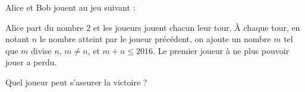 Alice et Bob jouent au jeu suivant :

Alice part du nombre $2$ et les joueurs jouent chacun leur tour. À chaque tour, en notant $n$ le nombre atteint par le joueur précédent, on ajoute un nombre $m$ tel que $m$ divise $n$, $m \ne n$, et $m+n \le 2016$. Le premier joueur à ne plus pouvoir jouer a perdu.

Quel joueur peut s'assurer la victoire ?
